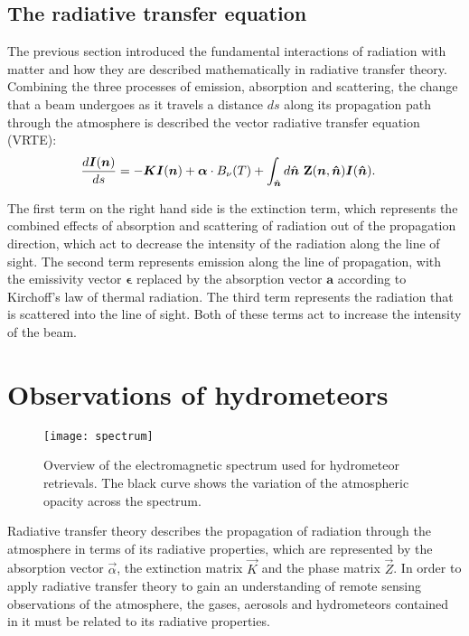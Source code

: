 \subsection{The radiative transfer equation}

The previous section introduced the fundamental interactions of radiation
with matter and how they are described mathematically in radiative transfer
theory. Combining the three processes of emission, absorption and scattering,
the change that a beam undergoes as it travels a distance $ds$ along its
propagation path through the atmosphere is described the vector radiative
transfer equation (VRTE):
\begin{align}\label{eq:vrte}
  \frac{d\bm{I}(\bm{n})}{ds} &=
  -\bm{K}\bm{I}(\bm{n}) + \bm{\alpha} \cdot B_\nu(T) + \int_{\hat{\bm{n}}} d\hat{\bm{n}} \ \mathbf{Z}(\bm{n}, \bm{\hat{n}}) \bm{I}(\bm{\hat{n}}).
  \end{align}

The first term on the right hand side is the extinction term, which represents
the combined effects of absorption and scattering of radiation out of the
propagation direction, which act to decrease the intensity of the radiation
along the line of sight. The second term represents emission along the line of
propagation, with the emissivity vector $\bm{\epsilon}$ replaced by the
absorption vector $\bm{a}$ according to Kirchoff's law of thermal radiation.
The third term represents the radiation that is scattered into the line of
sight. Both of these terms act to increase the intensity of the beam. 

\section{Observations of hydrometeors}
%
\begin{figure}[!tbp]
  \centering
  \texttt{[image: spectrum]}
  \caption{Overview of the electromagnetic spectrum used for hydrometeor retrievals. The black
    curve shows the variation of the atmospheric opacity across the spectrum.}
  \label{fig:radiative_transfer:spectrum}
\end{figure}

Radiative transfer theory describes the propagation of radiation through the
atmosphere in terms of its radiative properties, which are represented by the
absorption vector $\vec{\alpha}$, the extinction matrix $\vec{K}$ and the phase
matrix $\vec{Z}$. In order to apply radiative transfer theory to gain an
understanding of remote sensing observations of the atmosphere, the gases,
aerosols and hydrometeors contained in it must be related to its radiative
properties.

